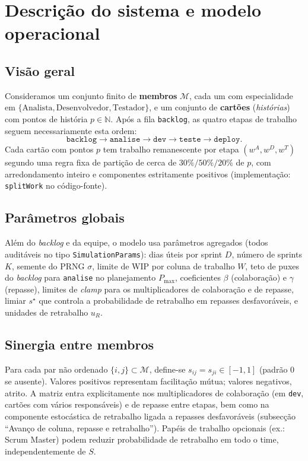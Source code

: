 \section{Descrição do sistema e modelo operacional}
\label{sec:modelo}

\subsection{Visão geral}
Consideramos um conjunto finito de \textbf{membros} $\mathcal{M}$, cada um com especialidade em $\{\text{Analista},\text{Desenvolvedor},\text{Testador}\}$, e um conjunto de \textbf{cartões} (\emph{histórias}) com pontos de história $p\in\mathbb{N}$. Após a fila \texttt{backlog}, as quatro etapas de trabalho seguem necessariamente esta ordem:
\[
\texttt{backlog}\rightarrow\texttt{analise}\rightarrow\texttt{dev}\rightarrow\texttt{teste}\rightarrow\texttt{deploy}.
\]
Cada cartão com pontos $p$ tem trabalho remanescente por etapa $(w^A,w^D,w^T)$ segundo uma regra fixa de partição de cerca de $30\%/50\%/20\%$ de $p$, com arredondamento inteiro e componentes estritamente positivos (implementação: \texttt{splitWork} no código-fonte).

\subsection{Parâmetros globais}
Além do \emph{backlog} e da equipe, o modelo usa parâmetros agregados (todos auditáveis no tipo \texttt{SimulationParams}): dias úteis por sprint $D$, número de sprints $K$, semente do PRNG $\sigma$, limite de WIP por coluna de trabalho $W$, teto de puxes do \emph{backlog} para \texttt{analise} no planejamento $P_{\max}$, coeficientes $\beta$ (colaboração) e $\gamma$ (repasse), limites de \emph{clamp} para os multiplicadores de colaboração e de repasse, limiar $s^\star$ que controla a probabilidade de retrabalho em repasses desfavoráveis, e unidades de retrabalho $u_R$.

\subsection{Sinergia entre membros}
Para cada par não ordenado $\{i,j\}\subset\mathcal{M}$, define-se $s_{ij}=s_{ji}\in[-1,1]$ (padrão $0$ se ausente). Valores positivos representam facilitação mútua; valores negativos, atrito. A matriz entra explicitamente nos multiplicadores de colaboração (em \texttt{dev}, cartões com vários responsáveis) e de repasse entre etapas, bem como na componente estocástica de retrabalho ligada a repasses desfavoráveis (subsecção ``Avanço de coluna, repasse e retrabalho''). Papéis de trabalho opcionais (ex.: Scrum Master) podem reduzir probabilidade de retrabalho em todo o time, independentemente de $S$.

